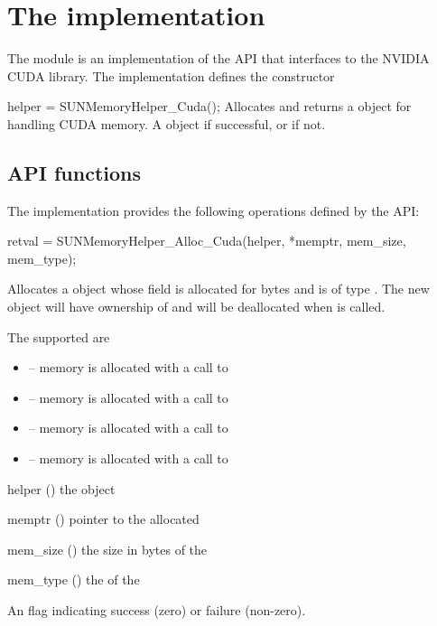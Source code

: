 \section{The  implementation}\label{s:sunmemory_cuda}

The  module is an implementation of the  API
that interfaces to the NVIDIA CUDA \cite{cuda_site} library.  The implementation defines
the constructor

{
  helper = SUNMemoryHelper\_Cuda();
}
{
  Allocates and returns a  object for handling CUDA memory.
}
{}
{
  A  object if successful, or  if not.
}
{}


%
%
\subsection{ API functions}\label{ss:sunmemcuda_functions}

The implementation provides the following operations defined by the  API:

{
  retval = SUNMemoryHelper\_Alloc\_Cuda(helper, *memptr, mem\_size, mem\_type);
}
{
  Allocates a  object whose  field is allocated for
   bytes and is of type . The new object will
  have ownership of  and will be deallocated when
   is called.

  The  supported are
  \begin{itemize}
    \item {} -- memory is allocated with a call to 
    \item {} -- memory is allocated with a call to 
    \item {} -- memory is allocated with a call to 
    \item {} -- memory is allocated with a call to 
  \end{itemize}
}
{
  \begin{args}
  \item[helper] () the  object
  \item[memptr] () pointer to the allocated 
  \item[mem\_size] () the size in bytes of the 
  \item[mem\_type] () the  of the 
  \end{args}
}
{
  An  flag indicating success (zero) or failure (non-zero).
}
{}

